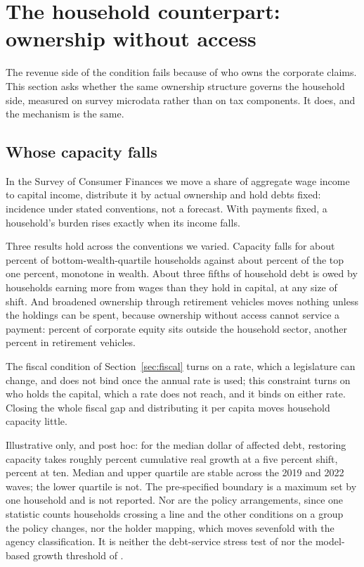 \section{The household counterpart: ownership without access}
\label{sec:household}

The revenue side of the condition fails because of who owns the corporate claims. This
section asks whether the same ownership structure governs the household side, measured on
survey microdata rather than on tax components. It does, and the mechanism is the same.

\subsection{Whose capacity falls}

In the Survey of Consumer Finances we move a share of aggregate wage income to capital
income, distribute it by actual ownership and hold debts fixed: incidence under stated
conventions, not a forecast. With payments fixed, a household's burden rises exactly when
its income falls.

Three results hold across the conventions we varied. Capacity falls for about  percent
of bottom-wealth-quartile households against about  percent of
the top one percent, monotone in wealth. About three fifths of household debt is owed by
households earning more from wages than they hold in capital, at any size of shift. And
broadened ownership through retirement vehicles moves nothing unless the holdings can be
spent, because ownership without access cannot service a payment:
 percent of corporate equity sits outside the household
sector, another  percent in retirement vehicles.

The fiscal condition of Section~\ref{sec:fiscal} turns on a rate, which a legislature can
change, and does not bind once the annual rate is used; this constraint turns on who holds the
capital, which a rate does not reach, and it binds on either rate. Closing the whole fiscal gap and distributing it
per capita moves household capacity little.

Illustrative only, and post hoc: for the median dollar of affected debt, restoring capacity
takes roughly  percent cumulative real growth at a five percent shift,
 percent at ten. Median and upper quartile are stable across the 2019
and 2022 waves; the lower quartile is not. The pre-specified boundary is a maximum set by
one household and is not reported. Nor are the policy arrangements, since one statistic
counts households crossing a line and the other conditions on a group the policy changes,
nor the holder mapping, which moves sevenfold with the agency classification. It is neither
the debt-service stress test of \citet{BartscherKuhnSchularickSteins2020} nor the
model-based growth threshold of \citet{Bayraktar2026}.

